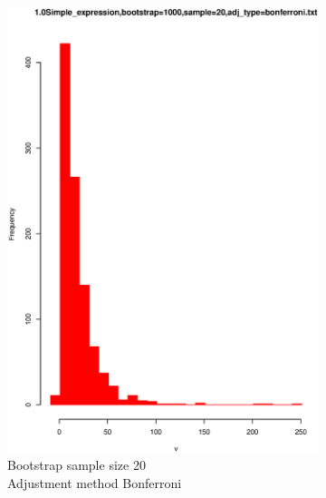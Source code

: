 \documentclass[11pt,a4paper,oneside]{article}
\begin{document}
\begin{figure}
\centering
\begin{subfigure}[b]{0.4\textwidth}
\includegraphics[width=\textwidth]{1.0Simple_expression,bootstrap=1000,sample=20,adj_type=bonferroni.txt.eps}
\caption{Bootstrap sample size 20\\Adjustment method Bonferroni}
\label{fig:pm1}
\end{subfigure}%
~~~~~~~~~~~~
\begin{subfigure}[b]{0.4\textwidth}

\end{subfigure}
\end{figure}
\end{document}
